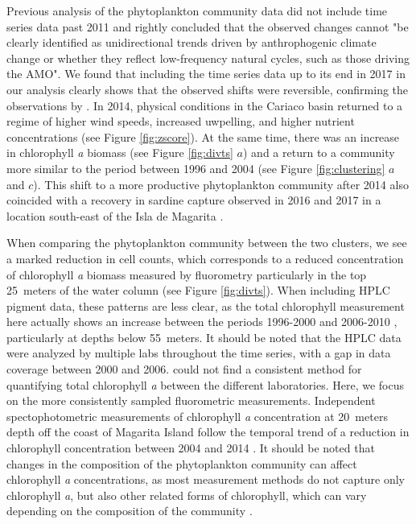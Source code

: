 \documentclass[draft]{agujournal2019}
\begin{document}
Previous analysis of the phytoplankton community data did not include time series data past 2011 and  rightly concluded that the observed changes cannot "be clearly identified as unidirectional trends driven by anthrophogenic climate change or whether they reflect low-frequency natural cycles, such as those driving the AMO". 
We found that including the time series data up to its end in 2017 in our analysis clearly shows that the observed shifts were reversible, confirming the observations by . In 2014, physical conditions in the Cariaco basin returned to a regime of higher wind speeds, increased uwpelling, and higher nutrient concentrations (see Figure \ref{fig:zscore}). At the same time, there was an increase in chlorophyll \textit{a} biomass (see Figure \ref{fig:divts} $a$) and a return to a community more similar to the period between 1996 and 2004 (see Figure \ref{fig:clustering} $a$ and $c$). This shift to a more productive phytoplankton community after 2014 also coincided with a recovery in sardine capture observed in 2016 and 2017 in a location south-east of the Isla de Magarita \cite{gomez_gaspar_variacion_2025}.

When comparing the phytoplankton community between the two clusters, we see a marked reduction in cell counts, which corresponds to a reduced concentration of chlorophyll \textit{a} biomass measured by fluorometry particularly in the top \qty{25}{meters} of the water column (see Figure \ref{fig:divts}). When including HPLC pigment data, these patterns are less clear, as the total chlorophyll measurement here actually shows an increase between the periods 1996-2000 and 2006-2010 \cite{pinckney_phytoplankton_2015}, particularly at depths below \qty{55}{meters}. It should be noted that the HPLC data were analyzed by multiple labs throughout the time series, with a gap in data coverage between 2000 and 2006.  could not find a consistent method for quantifying total chlorophyll \textit{a} between the different laboratories. Here, we focus on the more consistently sampled fluorometric measurements. Independent spectophotometric measurements of chlorophyll \textit{a} concentration at \qty{20}{meters} depth off the coast of Magarita Island follow the temporal trend of a reduction in chlorophyll concentration between 2004 and 2014 \cite{gomez_gaspar_variacion_2025}. It should be noted that changes in the composition of the phytoplankton community can affect chlorophyll \textit{a} concentrations, as most measurement methods do not capture only chlorophyll \textit{a}, but also other related forms of chlorophyll, which can vary depending on the composition of the community \cite{welschmeyer_fluorometric_1994}.
\end{document}
